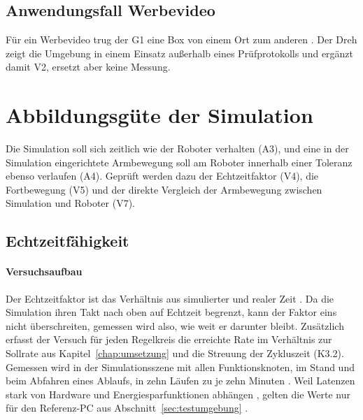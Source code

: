 \subsection{Anwendungsfall Werbevideo}
\label{sec:eval_video}
Für ein Werbevideo trug der G1 eine Box von einem Ort zum anderen .
Der Dreh zeigt die Umgebung in einem Einsatz außerhalb eines Prüfprotokolls und ergänzt damit V2, ersetzt aber keine Messung.

\section{Abbildungsgüte der Simulation}
\label{sec:eval_f2}
Die Simulation soll sich zeitlich wie der Roboter verhalten (A3), und eine in der Simulation eingerichtete Armbewegung soll am Roboter innerhalb einer Toleranz ebenso verlaufen (A4).
Geprüft werden dazu der Echtzeitfaktor (V4), die Fortbewegung (V5) und der direkte Vergleich der Armbewegung zwischen Simulation und Roboter (V7).

\subsection{Echtzeitfähigkeit}
\label{sec:eval_echtzeit}

\paragraph*{Versuchsaufbau}
Der Echtzeitfaktor ist das Verhältnis aus simulierter und realer Zeit \cite{Pitonakova2018}.
Da die Simulation ihren Takt nach oben auf Echtzeit begrenzt, kann der Faktor eins nicht überschreiten, gemessen wird also, wie weit er darunter bleibt.
Zusätzlich erfasst der Versuch für jeden Regelkreis die erreichte Rate im Verhältnis zur Sollrate aus Kapitel~\ref{chap:umsetzung} und die Streuung der Zykluszeit (K3.2).
Gemessen wird in der Simulationsszene mit allen Funktionsknoten, im Stand und beim Abfahren eines Ablaufs, in zehn Läufen zu je zehn Minuten .
Weil Latenzen stark von Hardware und Energiesparfunktionen abhängen \cite{Kronauer2021}, gelten die Werte nur für den Referenz-PC aus Abschnitt~\ref{sec:testumgebung} .

